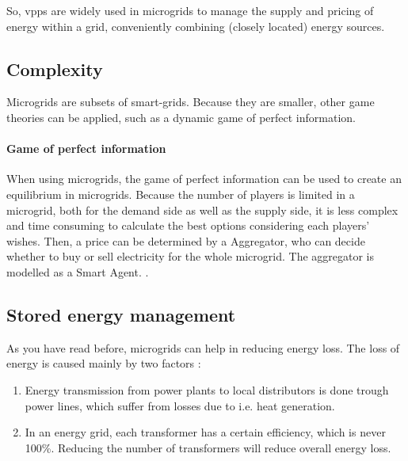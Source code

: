 So, \acp{vpp} are widely used in microgrids to manage the supply and pricing of energy within a grid, conveniently combining (closely located) energy sources.  


\subsection{Complexity}
Microgrids are subsets of smart-grids. Because they are smaller, other game theories can be applied, such as a dynamic game of perfect information. 

\paragraph{Game of perfect information}
When using microgrids, the game of perfect information can be used to create an equilibrium in microgrids. Because the number of players is limited in a microgrid, both for the demand side as well as the supply side, it is less complex and time consuming to calculate the best options considering each players' wishes. Then, a price can be determined by a Aggregator, who can decide whether to buy or sell electricity for the whole microgrid. The aggregator is modelled as a Smart Agent. \cite{MicrogridModellingPetrosAristidou}.


\subsection{Stored energy management}
As you have read before, microgrids can help in reducing energy loss. The loss of energy is caused mainly by two factors \cite{EnergyLossURL}: 

\begin{enumerate}
\item Energy transmission from power plants to local distributors is done trough power lines, which suffer from losses due to i.e. heat generation\cite{LasseterPaigi2004}.
\item In an energy grid, each transformer has a certain efficiency, which is never 100\%. Reducing the number of transformers will reduce overall energy loss.
\end{enumerate}

